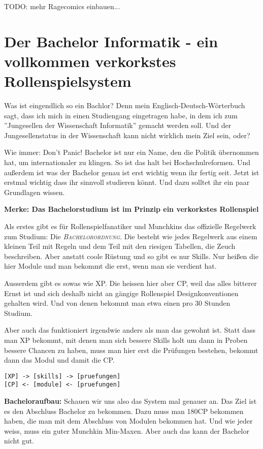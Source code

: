 TODO: mehr Ragecomics einbauen...

\section*{Der Bachelor Informatik - ein vollkommen verkorkstes Rollenspielsystem}
Was ist eingendlich so ein Bachlor? Denn mein Englisch-Deutsch-W\"orterbuch
sagt, dass ich mich in einen Studiengang eingetragen habe, in dem ich zum
''Jungesellen der Wissenschaft Informatik'' gemacht werden soll. Und der
Jungesellenstatus in der Wissenschaft kann nicht wirklich mein Ziel sein, oder?

Wie immer: Don't Panic! Bachelor ist nur ein Name, den die Politik \"ubernommen
hat, um internationaler zu klingen.  So ist das halt bei Hochschulreformen. Und
au{\ss}erdem ist was der Bachelor genau ist erst wichtig wenn ihr fertig seit.
Jetzt ist erstmal wichtig dass ihr sinnvoll studieren k\"onnt. Und dazu solltet
ihr ein paar Grundlagen wissen.

\textbf{Merke: Das Bachelorstudium ist im Prinzip ein verkorkstes Rollenspiel}

Als erstes gibt es f\"ur Rollenspielfanatiker und Munchkins das offizielle
Regelwerk zum Studium: Die \textsc{\textit{Bachelorordnung}}. Die besteht wie jedes
Regelwerk aus einem kleinen Teil mit Regeln
und dem Teil mit den riesigen
Tabellen, die Zeuch beschreiben. Aber anstatt coole R\"ustung und so gibt es
nur Skills. Nur hei{\ss}en die hier Module und man bekommt die erst, wenn man sie
verdient hat.

Ausserdem gibt es sowas wie XP. Die heissen hier aber CP, weil das alles
bitterer Ernst ist und sich deshalb nicht an g\"angige Rollenspiel
Designkonventionen gehalten wird. Und von denen bekommt man etwa einen pro 30
Stunden Studium.

Aber auch das funktioniert irgendwie anders als man das gewohnt ist. Statt dass
man XP bekommt, mit denen man sich bessere Skills holt um dann in Proben
bessere Chancen zu haben, muss man hier erst die Pr\"ufungen bestehen, bekommt
dann das Modul und damit die CP.
{\large
\begin{verbatim}
[XP] -> [skills] -> [pruefungen]
[CP] <- [module] <- [pruefungen]
\end{verbatim}}


\textbf{Bacheloraufbau:}
Schauen wir uns also das System mal genauer an.
Das Ziel ist es den Abschluss Bachelor zu bekommen. Dazu muss man 180CP
bekommen haben, die man mit dem Abschluss von Modulen bekommen hat. Und wie
jeder weiss, muss ein guter Munchkin Min-Maxen. Aber auch das kann der Bachelor
nicht gut.

